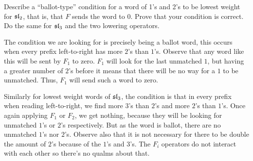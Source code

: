 \documentclass[12pt]{memoir}
\begin{document}
\begin{Ej}
    Describe a ``ballot-type'' condition for a word of 1's and 2's to be lowest weight for $\mathfrak{sl}_2$, that is, that $F$ sends the word to $0$. Prove that your condition is correct. Do the same for $\mathfrak{sl}_3$ and the two lowering operators.
\end{Ej}

\begin{ptcbr}
   The condition we are looking for is precisely being a ballot word, this occurs when every prefix left-to-right has more $2$'s than $1$'s. Observe that any word like this will be sent by $F_1$ to zero. $F_1$ will look for the last unmatched $1$, but having a greater number of $2$'s before it means that there will be no way for a $1$ to be unmatched. Thus, $F_1$ will send such a word to zero.\par
   Similarly for lowest weight words of $\mathfrak{sl}_3$, the condition is that in every prefix when reading left-to-right, we find more $3$'s than $2$'s and more $2$'s than $1$'s. Once again applying $F_1$ or $F_2$, we get nothing, because they will be looking for unmatched $1$'s or $2$'s respectively. But as the word is ballot, there are no unmatched $1$'s nor $2$'s. Observe also that it is not necessary for there to be double the amount of $2$'s because of the $1$'s and $3$'s. The $F_i$ operators do not interact with each other so there's no qualms about that.
\end{ptcbr}
\end{document}
